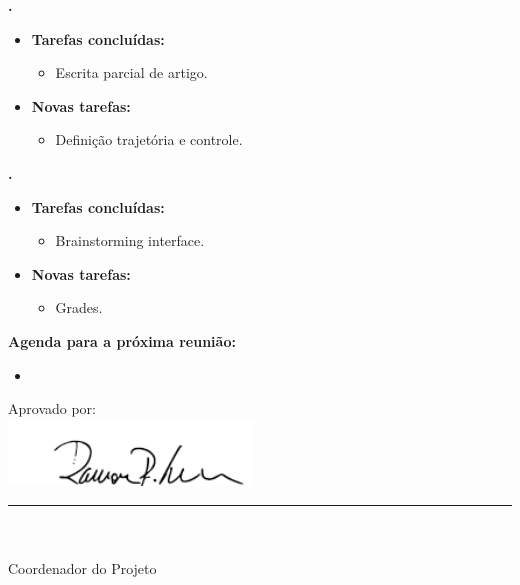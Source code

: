   \textbf{\renan.} 
	\begin{itemize}
		\item \textbf{Tarefas concluídas:}
			\begin{itemize}    
				\item Escrita parcial de artigo.
			\end{itemize}
		
		\item \textbf{Novas tarefas:}
			\begin{itemize} 
			    \item Definição trajetória e controle.
			\end{itemize}
	\end{itemize}	
			
   \textbf{\julia.} 
	\begin{itemize}
		\item \textbf{Tarefas concluídas:}
			\begin{itemize}    
				\item Brainstorming interface.
			\end{itemize}
		
		\item \textbf{Novas tarefas:}
			\begin{itemize} 
			    \item Grades.
			\end{itemize}
	\end{itemize}		



\textbf{Agenda para a próxima reunião:}
  \begin{itemize}
    \item 
  \end{itemize}


\vspace{5mm}%
\parbox[t]{70mm}{
  Aprovado por: \\[5mm]
  \centering
  \includegraphics[width=65mm]{figs/logo/assinatura-ramon.png} \\[-4mm]
  \rule[2mm]{70mm}{0.1mm} \\
  \ramon \\[1mm]
  Coordenador do Projeto \\
}

\fim
